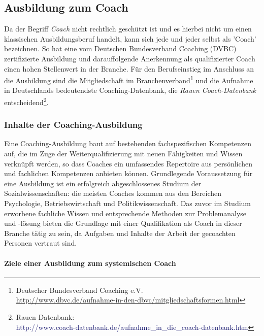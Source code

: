 \documentclass[11pt,a4paper]{article}
\begin{document}
\subsection*{\textsf{Ausbildung zum Coach}}

Da der Begriff \textsl{Coach} nicht rechtlich geschützt ist und es hierbei nicht um einen klassischen Ausbildungsberuf handelt, kann sich jede und jeder selbst als 'Coach' bezeichnen. So hat eine vom Deutschen Bundesverband Coaching (DVBC) zertifizierte Ausbildung und darauffolgende Anerkennung als qualifizierter Coach einen hohen Stellenwert in der Branche. Für den Berufseinstieg im Anschluss an die Ausbildung sind die Mitgliedschaft im Branchenverband\footnote{Deutscher Bundesverband Coaching e.V.\\ \textsf{\textcolor{MidnightBlue}{\url{http://www.dbvc.de/aufnahme-in-den-dbvc/mitgliedschaftsformen.html}}}} und die Aufnahme in Deutschlands bedeutendste Coaching-Datenbank, die \textsl{Rauen Coach-Datenbank} entscheidend\footnote{Rauen Datenbank:\\\textsf{\textcolor{MidnightBlue}{http://www.coach-datenbank.de/aufnahme\_in\_die\_coach-datenbank.htm}}}. 

\subsubsection*{\textsf{Inhalte der Coaching-Ausbildung}}

Eine Coaching-Ausbildung baut auf bestehenden fachspezifischen Kompetenzen auf, die im Zuge der Weiterqualifizierung mit neuen Fähigkeiten und Wissen verknüpft werden, so dass Coaches ein umfassendes Repertoire aus persönlichen und fachlichen Kompetenzen anbieten können. Grundlegende Voraussetzung für eine Ausbildung ist ein erfolgreich abgeschlossenes Studium der Sozialwissenschaften: die meisten Coaches kommen aus den Bereichen Psychologie, Betriebswirtschaft und Politikwissenschaft. Das zuvor im Studium erworbene fachliche Wissen und entsprechende Methoden zur Problemanalyse und -lösung bieten die Grundlage mit einer Qualifikation als Coach in dieser Branche tätig zu sein, da Aufgaben und Inhalte der Arbeit der gecoachten Personen vertraut sind.

\paragraph*{\textsf{Ziele einer Ausbildung zum systemischen Coach}}
\end{document}
